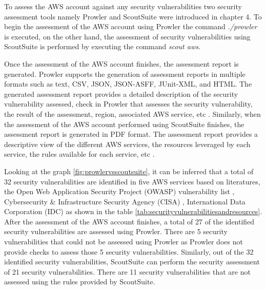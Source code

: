 \par To assess the AWS account against any security vulnerabilities two security assessment tools namely Prowler and ScoutSuite were introduced in chapter 4.
To begin the assessment of the AWS account using Prowler the command \textit{./prowler} is executed, on the other hand, the assessment of security vulnerabilities using ScoutSuite is performed by executing the command \textit{scout aws}.

\par Once the assessment of the AWS account finishes, the assessment report is generated.
Prowler supports the generation of assessment reports in multiple formats such as text, CSV, JSON, JSON-ASFF, JUnit-XML, and HTML.
The generated assessment report provides a detailed 
description of the security vulnerability assessed, check
in Prowler that assesses the security vulnerability, the result of the assessment, region, associated AWS service, etc \cite{75}.
Similarly, when the assessment of the AWS account performed using ScoutSuite finishes, the assessment report is generated in PDF format.
The assessment report provides a descriptive view of the 
different AWS services, the resources leveraged by each 
service, the rules available for each service, etc \cite{76}.


\par \par Looking at the graph \ref{fig:prowlervsscoutsuite}, it can be inferred that a total of 32 security vulnerabilities are identified in five AWS services based on literatures, the Open Web Application Security Project (OWASP) vulnerability list \cite{43}, Cybersecurity \& Infrastructure Security Agency (CISA) \cite{42}, International Data Corporation (IDC) \cite{41} as shown in the table \ref{tab:securityvulnerabilitiesandresources}.
After the assessment of the AWS account finishes, a total of 27 of the identified security vulnerabilities are assessed using Prowler.
There are 5 security vulnerabilities that could not be assessed using Prowler as Prowler does not provide checks to assess those 5 security vulnerabilities.
Similarly, out of the 32 identified security vulnerabilities, ScoutSuite can perform the security assessment of 21 security vulnerabilities.
There are 11 security vulnerabilities that are not assessed using the rules provided by ScoutSuite.


